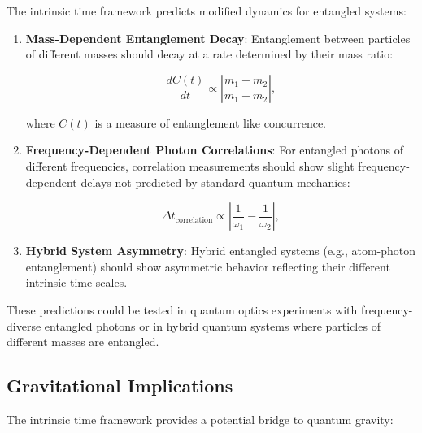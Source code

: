\documentclass[12pt,a4paper]{article}
\begin{document}
	The intrinsic time framework predicts modified dynamics for entangled systems:
	
	\begin{enumerate}
		\item \textbf{Mass-Dependent Entanglement Decay}: Entanglement between particles of different masses should decay at a rate determined by their mass ratio:
		
		\begin{equation}
			\frac{dC(t)}{dt} \propto \left|\frac{m_1 - m_2}{m_1 + m_2}\right|,
			\label{eq:entanglement_decay}
		\end{equation}
		
		where $C(t)$ is a measure of entanglement like concurrence.
		
		\item \textbf{Frequency-Dependent Photon Correlations}: For entangled photons of different frequencies, correlation measurements should show slight frequency-dependent delays not predicted by standard quantum mechanics:
		
		\begin{equation}
			\Delta t_{\text{correlation}} \propto \left|\frac{1}{\omega_1} - \frac{1}{\omega_2}\right|,
			\label{eq:frequency_delay}
		\end{equation}
		
		\item \textbf{Hybrid System Asymmetry}: Hybrid entangled systems (e.g., atom-photon entanglement) should show asymmetric behavior reflecting their different intrinsic time scales.
	\end{enumerate}
	
	These predictions could be tested in quantum optics experiments with frequency-diverse entangled photons or in hybrid quantum systems where particles of different masses are entangled.
	
	\subsection{Gravitational Implications}
	\label{subsec:gravitational_implications}
	
	The intrinsic time framework provides a potential bridge to quantum gravity:
	
\end{document}
